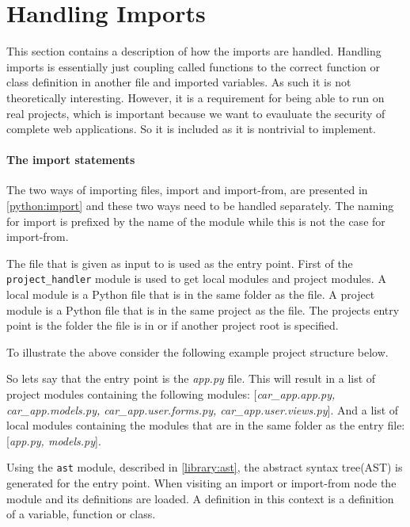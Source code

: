 \section{Handling Imports}
This section contains a description of how the imports are handled.
Handling imports is essentially just coupling called functions to the correct function or class definition in another file and imported variables.
As such it is not theoretically interesting.
However, it is a requirement for being able to run \pyt{} on real projects, which is important because we want to evauluate the security of complete web applications.
So it is included as it is nontrivial to implement.

\paragraph{The import statements}
The two ways of importing files, import and import-from, are presented in \cref{python:import} and these two ways need to be handled separately.
The naming for import is prefixed by the name of the module while this is not the case for import-from.


The file that is given as input to \pyt{} is used as the entry point.
First of the \texttt{project\_handler} module is used to get local modules and project modules.
A local module is a Python file that is in the same folder as the file.
A project module is a Python file that is in the same project as the file.
The projects entry point is the folder the file is in or if another project root is specified.

To illustrate the above consider the following example project structure below.

\hfill
{}  
\hfill

So lets say that the entry point is the \textit{app.py} file.
This will result in a list of project modules containing the following modules: [\textit{car\_app.app.py, car\_app.models.py, car\_app.user.forms.py, car\_app.user.views.py}].
And a list of local modules containing the modules that are in the same folder as the entry file: [\textit{app.py, models.py}].


Using the \texttt{ast} module, described in \cref{library:ast}, the abstract syntax tree(AST) is generated for the entry point.
When visiting an import or import-from node the module and its definitions are loaded.
A definition in this context is a definition of a variable, function or class.

